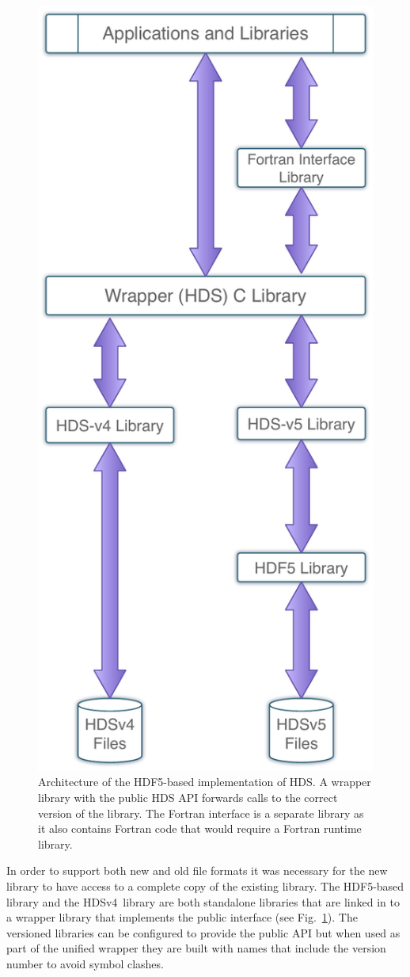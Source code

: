 \documentclass[final,authoryear,5p,times,twocolumn]{elsarticle}
\newcommand{\old}{HDSv4}
\begin{document}
\begin{figure}[t]
\begin{center}
\includegraphics[width=0.7\columnwidth]{LibraryArchitecture}
\end{center}
\caption{Architecture of the HDF5-based implementation of HDS. A
  wrapper library with the public HDS API forwards calls to the
  correct version of the library. The Fortran interface is a separate
  library as it also contains Fortran code that would require a
  Fortran runtime library.}
\label{fig:arch}
\end{figure}

In order to support both new and old file formats it was necessary for
the new library to have access to a complete copy of the existing
library. The HDF5-based library and the \old\ library are both
standalone libraries that are linked in to a wrapper library that
implements the public interface (see Fig.~\ref{fig:arch}). The versioned libraries can be
configured to provide the public API but when used as part of the
unified wrapper they are built with names that include the version
number to avoid symbol clashes.
\end{document}
